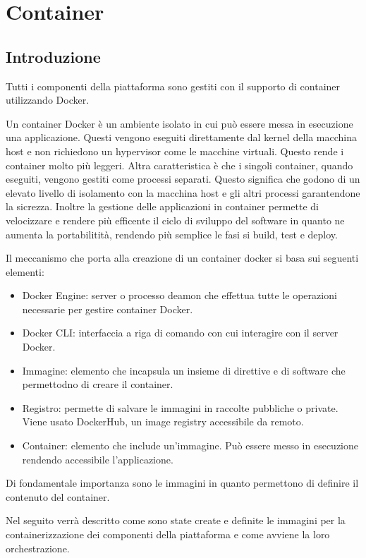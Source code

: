 \section{Container}
\subsection{Introduzione}
Tutti i componenti della piattaforma sono gestiti con il supporto di container utilizzando Docker.

Un container Docker è un ambiente isolato in cui può essere messa in esecuzione una applicazione.
Questi vengono eseguiti direttamente dal kernel della macchina host e non richiedono un hypervisor come le
macchine virtuali. Questo rende i container molto più leggeri. Altra caratteristica è che i singoli container,
quando eseguiti, vengono gestiti come processi separati. Questo significa che godono di un elevato livello di isolamento
con la macchina host e gli altri processi garantendone la sicrezza.
Inoltre la gestione delle applicazioni in container permette di velocizzare e rendere più efficente il ciclo di sviluppo del software in quanto
ne aumenta la portabilitità, rendendo più semplice le fasi si build, test e deploy.

Il meccanismo che porta alla creazione di un container docker si basa sui seguenti elementi:
\begin{itemize}
    \itemsep0em
    \item Docker Engine: server o processo deamon che effettua tutte le operazioni necessarie per gestire container Docker.
    \item Docker CLI: interfaccia a riga di comando con cui interagire con il server Docker.
    \item Immagine: elemento che incapsula un insieme di direttive e di software che permettodno di creare il container.
    \item Registro: permette di salvare le immagini in raccolte pubbliche o private. Viene usato DockerHub, un image registry accessibile da remoto.
    \item Container: elemento che include un'immagine. Può essere messo in esecuzione rendendo accessibile l'applicazione.
\end{itemize}

Di fondamentale importanza sono le immagini in quanto permettono di definire il contenuto del container.

Nel seguito verrà descritto come sono state create e definite le immagini per la containerizzazione dei componenti della piattaforma
e come avviene la loro orchestrazione.

